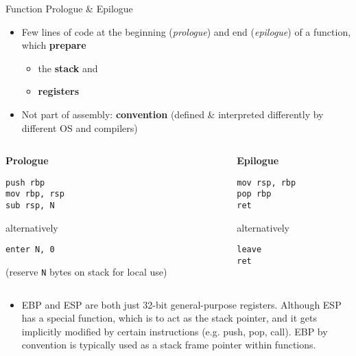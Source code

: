 \begin{frame}[fragile]{Function Prologue \& Epilogue}
    \begin{itemize}
        \item Few lines of code at the beginning (\textit{prologue}) and end (\textit{epilogue}) of a function, which \textbf{prepare}
        \begin{itemize}
            \item the \textbf{stack} and 
            \item \textbf{registers}
        \end{itemize}
        \item Not part of assembly: \textbf{convention} (defined \& interpreted differently by different OS and compilers)
    \end{itemize}

    \begin{columns}[t]
        \begin{column}{.45\textwidth}
            \textbf{Prologue}
            \begin{lstlisting}[language={}]
push rbp
mov rbp, rsp
sub rsp, N
            \end{lstlisting}
            alternatively
            \begin{lstlisting}[language={}]
enter N, 0
            \end{lstlisting}
            (reserve \texttt{N} bytes on stack for local use)
        \end{column}
        \begin{column}{.45\textwidth}
            \textbf{Epilogue}
            \begin{lstlisting}[language={}]
mov rsp, rbp
pop rbp
ret
            \end{lstlisting}
            alternatively
            \begin{lstlisting}[language={}]
leave
ret
            \end{lstlisting}
        \end{column}
    \end{columns}
\end{frame}

\begin{frame}[plain]
    \begin{itemize}
        \item EBP and ESP are both just 32-bit general-purpose registers. Although ESP has a special function, which is to act as the stack pointer, and it gets implicitly modified by certain instructions (e.g. push, pop, call). EBP by convention is typically used as a stack frame pointer within functions.
    \end{itemize}
\end{frame}

